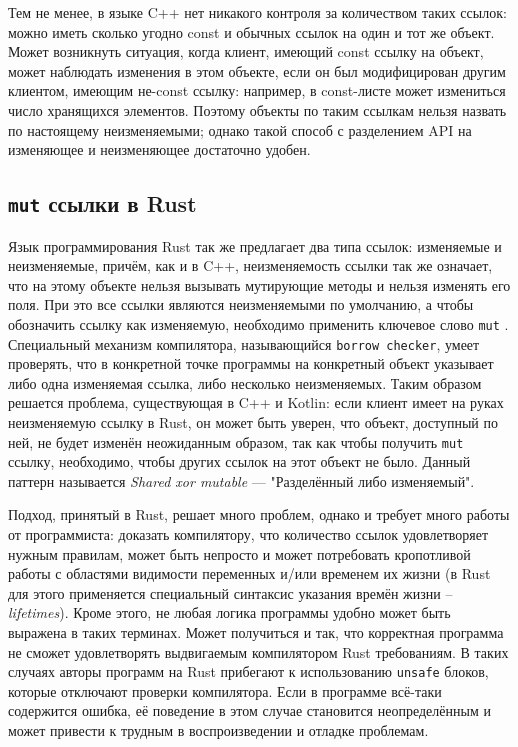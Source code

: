 \documentclass[specification,annotation,times]{itmo-student-thesis}
\begin{document}
Тем не менее, в языке C++ нет никакого контроля за количеством таких ссылок: можно иметь сколько угодно const и обычных ссылок на один и тот же объект. Может возникнуть ситуация, когда клиент, имеющий const ссылку на объект, может наблюдать изменения в этом объекте, если он был модифицирован другим клиентом, имеющим не-const ссылку: например, в const-листе может измениться число хранящихся элементов.
Поэтому объекты по таким ссылкам нельзя назвать по настоящему неизменяемыми; однако такой способ с разделением API на изменяющее и неизменяющее достаточно удобен.

\subsection{\texttt{mut} ссылки в Rust}

Язык программирования Rust так же предлагает два типа ссылок: изменяемые и неизменяемые, причём, как и в C++, неизменяемость ссылки так же означает, что на этому объекте нельзя вызывать мутирующие методы и нельзя изменять его поля. При это все ссылки являются неизменяемыми по умолчанию, а чтобы обозначить ссылку как изменяемую, необходимо применить ключевое слово \texttt{mut} \cite{rust-mut}. 
Специальный механизм компилятора, называющийся \texttt{borrow checker}, умеет проверять, что в конкретной точке программы на конкретный объект указывает либо одна изменяемая ссылка, либо несколько неизменяемых.
Таким образом решается проблема, существующая в C++ и Kotlin: если клиент имеет на руках неизменяемую ссылку в Rust, он может быть уверен, что объект, доступный по ней, не будет изменён неожиданным образом, так как чтобы получить \texttt{mut} ссылку, необходимо, чтобы других ссылок на этот объект не было.
Данный паттерн называется \textit{Shared xor mutable} --- "Разделённый либо изменяемый".

Подход, принятый в Rust, решает много проблем, однако и требует много работы от программиста: доказать компилятору, что количество ссылок удовлетворяет нужным правилам, может быть непросто и может потребовать кропотливой работы с областями видимости переменных и/или временем их жизни (в Rust для этого применяется специальный синтаксис указания времён жизни -- \textit{lifetimes}).
Кроме этого, не любая логика программы удобно может быть выражена в таких терминах. Может получиться и так, что корректная программа не сможет удовлетворять выдвигаемым компилятором Rust требованиям.
В таких случаях авторы программ на Rust прибегают к использованию \texttt{unsafe} блоков, которые отключают проверки компилятора.
Если в программе всё-таки содержится ошибка, её поведение в этом случае становится неопределённым и может привести к трудным в воспроизведении и отладке проблемам.
\end{document}
